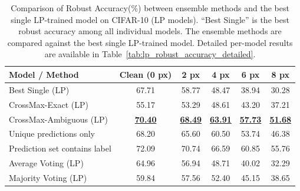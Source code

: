 \begin{table}[H]
\centering
\small
\caption{Comparison of Robust Accuracy(\%) between ensemble methods and the best single LP-trained model on CIFAR-10 (LP models). 
    ``Best Single'' is the best robust accuracy among all individual models. 
    The ensemble methods are compared against the best single LP-trained model. 
    Detailed per-model results are available in Table~\ref{tab:lp_robust_accuracy_detailed}.}
\label{tab:ensemble_lp_compact}
\begin{tabular}{lccccc}
\toprule
\textbf{Model / Method} & \textbf{Clean (0 px)} & \textbf{2 px} & \textbf{4 px} & \textbf{6 px} & \textbf{8 px} \\
\midrule
Best Single (LP)            & 67.71 & 58.77 & 48.47 & 38.94 & 30.28 \\
\midrule
CrossMax-Exact (LP)         & 55.17 & 53.29 & 48.61 & 43.20 & 37.21 \\
CrossMax-Ambiguous (LP)     & \underline{\textbf{70.40}} & \underline{\textbf{68.49}} & \underline{\textbf{63.91}} & \underline{\textbf{57.73}} & \underline{\textbf{51.68}} \\
\quad Unique predictions only & 68.20 & 65.60 & 60.50 & 53.74 & 46.38 \\
\quad Prediction set contains label & 72.09 & 70.74 & 66.59 & 60.85 & 55.76 \\
\midrule
Average Voting (LP)         & 64.96 & 56.94 & 48.71 & 40.02 & 32.29 \\
Majority Voting (LP)        & 59.84 & 57.56 & 52.40 & 45.15 & 38.65 \\
\bottomrule
\end{tabular}
\end{table}


